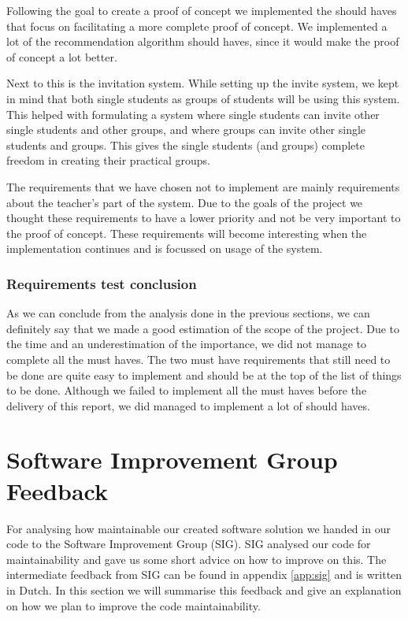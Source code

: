 Following the goal to create a proof of concept we implemented the should haves that focus on facilitating a more complete proof of concept.
We implemented a lot of the recommendation algorithm should haves, since it would make the proof of concept a lot better.

Next to this is the invitation system.
While setting up the invite system, we kept in mind that both single students as groups of students will be using this system.
This helped with formulating a system where single students can invite other single students and other groups, and where groups can invite other single students and groups.
This gives the single students (and groups) complete freedom in creating their practical groups.

The requirements that we have chosen not to implement are mainly requirements about the teacher's part of the system.
Due to the goals of the project we thought these requirements to have a lower priority and not be very important to the proof of concept.
These requirements will become interesting when the implementation continues and is focussed on usage of the system.

\subsubsection{Requirements test conclusion}
As we can conclude from the analysis done in the previous sections, we can definitely say that we made a good estimation of the scope of the project.
Due to the time and an underestimation of the importance, we did not manage to complete all the must haves.
The two must have requirements that still need to be done are quite easy to implement and should be at the top of the list of things to be done.
Although we failed to implement all the must haves before the delivery of this report, we did managed to implement a lot of should haves.

\section{Software Improvement Group Feedback}
For analysing how maintainable our created software solution we handed in our code to the Software Improvement Group (SIG).
SIG analysed our code for maintainability and gave us some short advice on how to improve on this.
The intermediate feedback from SIG can be found in appendix \ref{app:sig} and is written in Dutch.
In this section we will summarise this feedback and give an explanation on how we plan to improve the code maintainability.  

